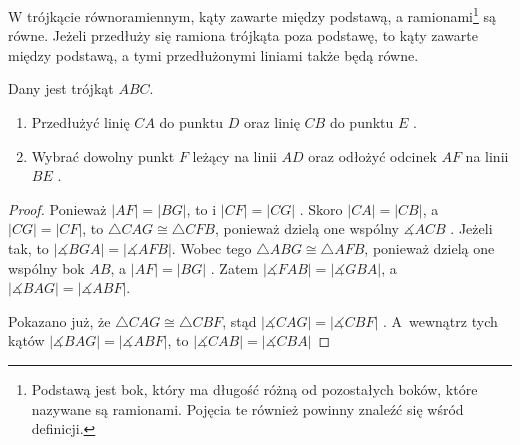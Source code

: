 \documentclass[12pt, a4paper]{scrartcl}
\begin{document}
\begin{theorem}

W trójkącie równoramiennym, kąty zawarte między podstawą, a ramionami\footnote{
    Podstawą jest bok, który ma długość różną od pozostałych boków, które
    nazywane są ramionami. Pojęcia te również powinny znaleźć się wśród
    definicji.
} są równe. Jeżeli przedłuży się ramiona trójkąta poza podstawę, to kąty
zawarte między podstawą, a tymi przedłużonymi liniami także będą równe.

\begin{figure}[!h]
    \begin{center}
    \end{center}
\end{figure}

Dany jest trójkąt \(ABC\).

\begin{enumerate}
    \item Przedłużyć linię \(CA\) do punktu \(D\) oraz linię \(CB\) do punktu
        \(E\) .
    \item Wybrać dowolny punkt \(F\) leżący na linii \(AD\) oraz odłożyć odcinek
        \(AF\) na linii \(BE\) .
\end{enumerate}

\begin{proof}
    Ponieważ \(|AF| = |BG|\), to i \(|CF| = |CG|\) . Skoro \(|CA| =
    |CB|\), a \(|CG| = |CF|\), to \(\triangle CAG \cong \triangle CFB\),
    ponieważ dzielą one wspólny \(\measuredangle ACB\) . Jeżeli tak,
    to \(|\measuredangle BGA| = |\measuredangle AFB|\). Wobec tego \(\triangle
    ABG \cong \triangle AFB\), ponieważ dzielą one wspólny bok \(AB\), a \(|AF|
    = |BG|\) . Zatem \(|\measuredangle FAB| = |\measuredangle GBA|\),
    a \(|\measuredangle BAG| = |\measuredangle ABF|\).

    Pokazano już, że \(\triangle CAG \cong \triangle CBF\), stąd
    \(|\measuredangle CAG| = |\measuredangle CBF|\) . A~wewnątrz tych
    kątów \(|\measuredangle BAG| = |\measuredangle ABF|\), to \(|\measuredangle
    CAB| = |\measuredangle CBA|\) 
\end{proof}
\end{theorem}
\end{document}
